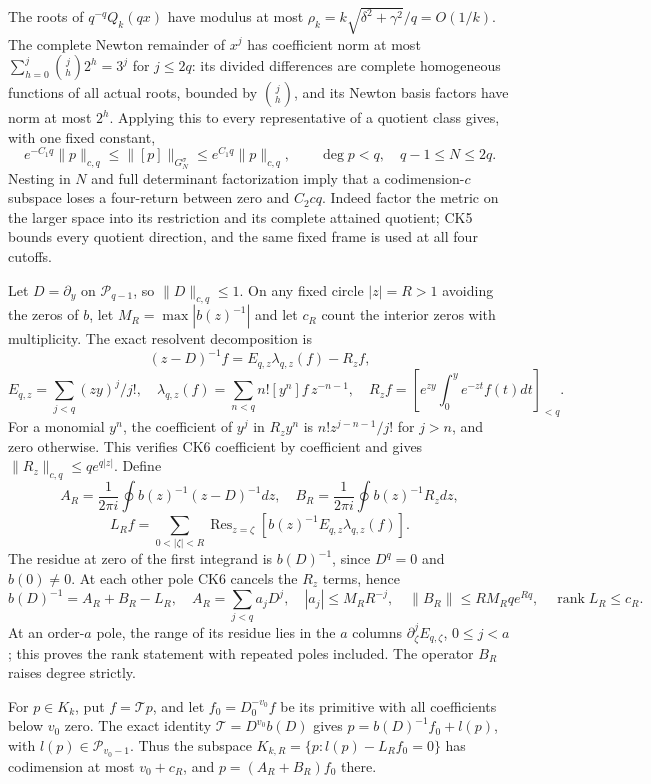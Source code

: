 \documentclass[10pt]{article}
\begin{document}
The roots of \(q^{-q}Q_k(qx)\) have modulus at most \(\rho_k=k\sqrt{\delta^2+\gamma^2}/q=O(1/k)\). The complete Newton remainder of \(x^j\) has coefficient norm at most \(\sum_{h=0}^j\binom jh2^h=3^j\) for \(j\le2q\): its divided differences are complete homogeneous functions of all actual roots, bounded by \(\binom jh\), and its Newton basis factors have norm at most \(2^h\). Applying this to every representative of a quotient class gives, with one fixed constant, \[
 e^{-C_1q}\|p\|_{c,q}\le\|[p]\|_{G_N^\sigma}\le e^{C_1q}\|p\|_{c,q},
 \qquad\deg p<q,\quad q-1\le N\le2q.
 \tag{CK5}
\] Nesting in \(N\) and full determinant factorization imply that a codimension-\(c\) subspace loses a four-return between zero and \(C_2cq\). Indeed factor the metric on the larger space into its restriction and its complete attained quotient; CK5 bounds every quotient direction, and the same fixed frame is used at all four cutoffs.

Let \(D=\partial_y\) on \(\mathcal P_{q-1}\), so \(\|D\|_{c,q}\le1\). On any fixed circle \(|z|=R>1\) avoiding the zeros of \(b\), let \(M_R=\max|b(z)^{-1}|\) and let \(c_R\) count the interior zeros with multiplicity. The exact resolvent decomposition is \[
 (z-D)^{-1}f=E_{q,z}\lambda_{q,z}(f)-R_zf,
\] \[
 E_{q,z}=\sum_{j<q}(zy)^j/j!,\quad
 \lambda_{q,z}(f)=\sum_{n<q}n![y^n]f\,z^{-n-1},\quad
 R_zf=[e^{zy}\int_0^ye^{-zt}f(t)dt]_{<q}.
 \tag{CK6}
\] For a monomial \(y^n\), the coefficient of \(y^j\) in \(R_zy^n\) is \(n!z^{j-n-1}/j!\) for \(j>n\), and zero otherwise. This verifies CK6 coefficient by coefficient and gives \(\|R_z\|_{c,q}\le qe^{q|z|}\). Define \[
 A_R=\frac1{2\pi i}\oint b(z)^{-1}(z-D)^{-1}dz,\quad
 B_R=\frac1{2\pi i}\oint b(z)^{-1}R_zdz,
\] \[
 L_Rf=\sum_{0<|\zeta|<R}\operatorname{Res}_{z=\zeta}
 [b(z)^{-1}E_{q,z}\lambda_{q,z}(f)].
\] The residue at zero of the first integrand is \(b(D)^{-1}\), since \(D^q=0\) and \(b(0)\ne0\). At each other pole CK6 cancels the \(R_z\) terms, hence \[
 b(D)^{-1}=A_R+B_R-L_R,\quad
 A_R=\sum_{j<q}a_jD^j,\quad |a_j|\le M_RR^{-j},\quad
 \|B_R\|\le RM_Rqe^{Rq},\quad\operatorname{rank}L_R\le c_R.
 \tag{CK7}
\] At an order-\(a\) pole, the range of its residue lies in the \(a\) columns \(\partial_\zeta^jE_{q,\zeta}\), \(0\le j<a\); this proves the rank statement with repeated poles included. The operator \(B_R\) raises degree strictly.

For \(p\in K_k\), put \(f=\mathcal Tp\), and let \(f_0=D^{-v_0}_0f\) be its primitive with all coefficients below \(v_0\) zero. The exact identity \(\mathcal T=D^{v_0}b(D)\) gives \(p=b(D)^{-1}f_0+l(p)\), with \(l(p)\in\mathcal P_{v_0-1}\). Thus the subspace \(K_{k,R}=\{p:l(p)-L_Rf_0=0\}\) has codimension at most \(v_0+c_R\), and \(p=(A_R+B_R)f_0\) there.
\end{document}
